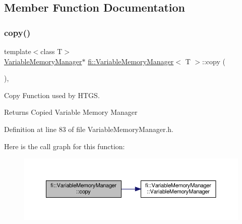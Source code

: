 \subsection{Member Function Documentation}
\mbox{\label{classfi_1_1VariableMemoryManager_aeac9f9bf6ed6cb9a308d0e24c73a6ede}} 
\subsubsection{\texorpdfstring{copy()}{copy()}}
{\footnotesize\ttfamily template$<$class T$>$ \\
\hyperlink{classfi_1_1VariableMemoryManager}{Variable\+Memory\+Manager}$\ast$ \hyperlink{classfi_1_1VariableMemoryManager}{fi\+::\+Variable\+Memory\+Manager}$<$ T $>$\+::copy (\begin{DoxyParamCaption}{ }\end{DoxyParamCaption})\hspace{0.3cm}{\ttfamily [inline]}, {\ttfamily [override]}}



Copy Function used by H\+T\+GS. 

\begin{DoxyReturn}{Returns}
Copied Variable Memory Manager 
\end{DoxyReturn}


Definition at line 83 of file Variable\+Memory\+Manager.\+h.

Here is the call graph for this function\+:
\nopagebreak
\begin{figure}[H]
\begin{center}
\leavevmode
\includegraphics[width=350pt]{d1/d0c/classfi_1_1VariableMemoryManager_aeac9f9bf6ed6cb9a308d0e24c73a6ede_cgraph}
\end{center}
\end{figure}
\mbox{\label{classfi_1_1VariableMemoryManager_aa5b46e9102d8f33f202e42ef33433a45}} 
